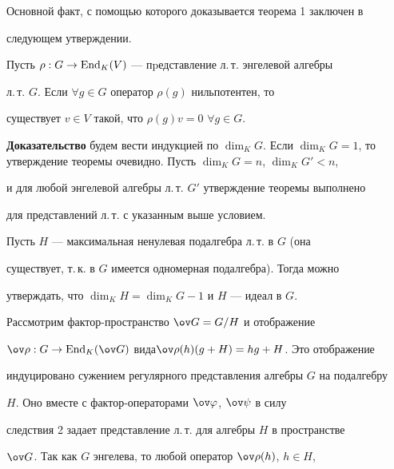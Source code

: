  


Основной факт, с помощью которого доказывается теорема 1 заключен в  


следующем утверждении. 


 


\begin{thm} 


Пусть $\rho:G\to\operatorname{End}_K(V)$ --- пpедставление л.\,т. энгелевой алгебры 


л.\,т. $G$. Если $\forall g\in G$ оператор $\rho(g)$ нильпотентен, то 


существует $v\in V$ такой, что $\rho(g)v=0$ $\forall g\in G$.  


\end{thm} 


 


 


{\bf Доказательство} будем вести индукцией по $\dim_K G$. Если $\dim_K 


G=1$, то утверждение теоремы очевидно. Пусть $\dim_K G=n$, $\dim_K G'<n$, 


и для любой энгелевой алгебры л.\,т. $G'$ утверждение теоремы выполнено 


для представлений л.\,т. с указанным выше условием.  


 


Пусть $H$ --- максимальная ненулевая подалгебра л.\,т. в $G$ (она 


существует, т.\,к. в $G$ имеется одномерная подалгебра). Тогда можно 


утверждать, что $\dim_K H=\dim_K G-1$ и $H$ --- идеал в $G$.  


 


Рассмотрим фактор-пространство $\ov G=G/H$ и отображение 


$\ov\rho:G\to\End_K(\ov G)$ вида\linebreak $\ov\rho(h)(g+H)=hg+H$. Это отображение 


индуцировано сужением регулярного представления алгебры $G$ на подалгебру 


$H$. Оно вместе с фактор-операторами $\ov\varphi$, $\ov\psi$ в силу 


следствия 2 задает представление л.\,т. для алгебры $H$ в пространстве 


$\ov G$. Так как $G$ энгелева, то любой оператор $\ov\rho(h)$, $h\in H$, 


